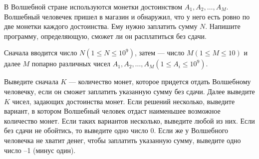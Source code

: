 В Волшебной стране используются монетки достоинством $A_1, A_2, \dots , A_M$. Волшебный человечек пришел в магазин и обнаружил, что у него есть ровно по две монетки каждого достоинства. Ему нужно заплатить сумму $N$. Напишите программу, определяющую, сможет ли он расплатиться без сдачи.

\InputFile 
Сначала вводится число $N (1 \leq N \leq 10^9)$, затем — число $M (1 \leq M \leq 10)$ и далее $M$ попарно различных чисел $A_1, A_2, \dots , A_M (1 \leq A_i \leq 10^9)$.

\OutputFile
Выведите сначала $K$ — количество монет, которое придется отдать Волшебному человечку, если он сможет заплатить указанную сумму без сдачи. Далее выведите $K$ чисел, задающих достоинства монет. Если решений несколько, выведите вариант, в котором Волшебный человек отдаст наименьшее возможное количество монет. Если таких вариантов несколько, выведите любой из них.
Если без сдачи не обойтись, то выведите одно число 0. Если же у Волшебного человечка не хватит денег, чтобы заплатить указанную сумму, выведите одно число –1 (минус один).

